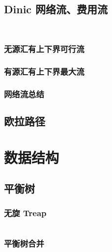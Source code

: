 \documentclass[10pt, a4paper, oneside]{ctexart}
\begin{document}
\begin{multicols}{2}
        \subsection{Dinic 网络流、费用流}
        \inputminted{cpp}{src/graph/dinic-flow.cpp}
        \inputminted{cpp}{src/graph/dinic-cost.cpp}
        \subsubsection{无源汇有上下界可行流}
        
        \subsubsection{有源汇有上下界最大流}
        
        \subsubsection{网络流总结}

        \subsection{欧拉路径}
        

        \section{数据结构}
        \subsection{平衡树}
        \subsubsection{无旋 Treap}
        \inputminted{cpp}{src/data structure/fhq.cpp}
        \subsubsection{平衡树合并}
        

\end{multicols}
\end{document}
